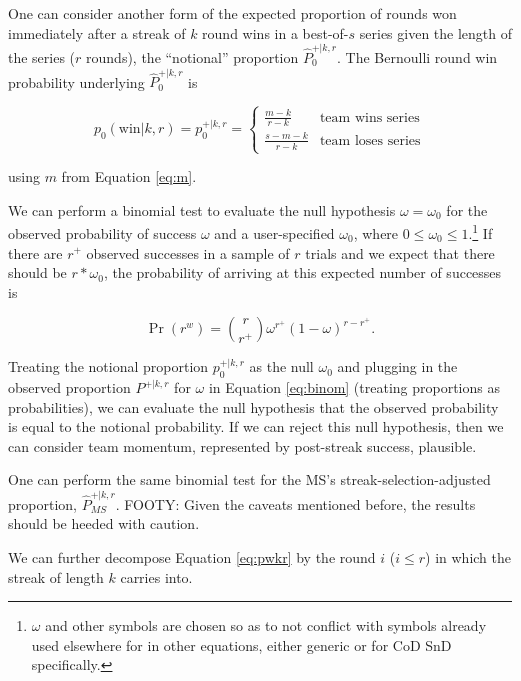 \documentclass{article}
\begin{document}
One can consider another form of the expected proportion of rounds won
immediately after a streak of \(k\) round wins in a best-of-\(s\) series
given the length of the series (\(r\) rounds), the ``notional''
proportion \(\hat{P}^{+|k,r}_0\). The Bernoulli round win probability
underlying \(\hat{P}^{+|k,r}_0\) is

\begin{equation}\label{eq:pwkr}
p_0(\text{win} | k, r) = p^{+|k,r}_0 = \begin{cases}
\frac{m - k}{r - k} & \text{team wins series} \\
\frac{s - m - k}{r - k} & \text{team loses series}
\end{cases}
\end{equation}

using \(m\) from Equation \ref{eq:m}.

We can perform a binomial test to evaluate the null hypothesis
\(\omega = \omega_0\) for the observed probability of success \(\omega\)
and a user-specified \(\omega_0\), where
\(0 \leq \omega_0 \leq 1\).\footnote{\(\omega\) and other symbols are
  chosen so as to not conflict with symbols already used elsewhere for
  in other equations, either generic or for CoD SnD specifically.} If
there are \(r^+\) observed successes in a sample of \(r\) trials and we
expect that there should be \(r * \omega_0\), the probability of
arriving at this expected number of successes is

\begin{equation}\label{eq:binom}
\Pr(r^w) = {\binom {r}{r^+}} \omega^{r^+}(1-\omega)^{r-r^+}.
\end{equation}

Treating the notional proportion \(p^{+|k,r}_0\) as the null
\(\omega_0\) and plugging in the observed proportion \(P^{+|k,r}\) for
\(\omega\) in Equation \ref{eq:binom} (treating proportions as
probabilities), we can evaluate the null hypothesis that the observed
probability is equal to the notional probability. If we can reject this
null hypothesis, then we can consider team momentum, represented by
post-streak success, plausible.

One can perform the same binomial test for the MS's
streak-selection-adjusted proportion, \(\hat{P}^{+|k,r}_{MS}\). FOOTY:
Given the caveats mentioned before, the results should be heeded with
caution.

We can further decompose Equation \ref{eq:pwkr} by the round \(i\)
(\(i \leq r\)) in which the streak of length \(k\) carries into.
\end{document}
